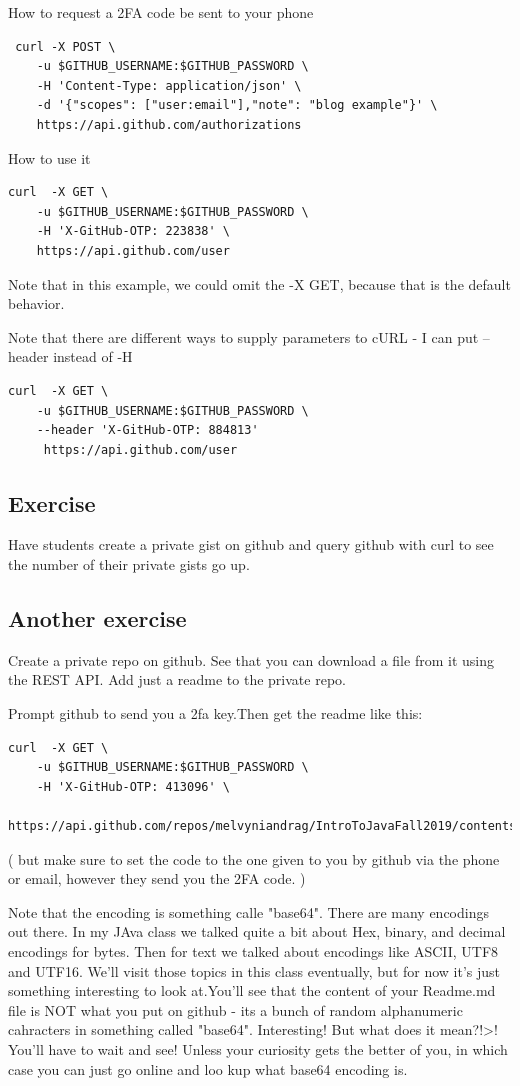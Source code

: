 \documentclass[10pt]{article}
\begin{document}
How to request a 2FA code be sent to your phone
\begin{lstlisting}
 curl -X POST \
	-u $GITHUB_USERNAME:$GITHUB_PASSWORD \
	-H 'Content-Type: application/json' \
	-d '{"scopes": ["user:email"],"note": "blog example"}' \
	https://api.github.com/authorizations
\end{lstlisting}

How to use it
\begin{lstlisting}
curl  -X GET \
	-u $GITHUB_USERNAME:$GITHUB_PASSWORD \
	-H 'X-GitHub-OTP: 223838' \
	https://api.github.com/user
\end{lstlisting}


Note that in this example, we could omit the -X GET, because that is the default behavior.

Note that there are different ways to supply parameters to cURL - I can put --header instead of -H

\begin{lstlisting}
curl  -X GET \
	-u $GITHUB_USERNAME:$GITHUB_PASSWORD \
	--header 'X-GitHub-OTP: 884813'
	 https://api.github.com/user
\end{lstlisting}

\subsection{Exercise}
Have students create a private gist on github and query github with curl to see the number of their private gists go up.

\subsection{Another exercise}
Create a private repo on github. See that you can download a file from it using the REST API. Add just a readme to the private repo.

Prompt github to send you a 2fa key.Then get the readme like this:

\begin{lstlisting}
curl  -X GET \
	-u $GITHUB_USERNAME:$GITHUB_PASSWORD \
	-H 'X-GitHub-OTP: 413096' \
	https://api.github.com/repos/melvyniandrag/IntroToJavaFall2019/contents/Readme.md
\end{lstlisting}

( but make sure to set the code to the one given to you by github via the phone or email, however they send you the 2FA code. )

Note that the encoding is something calle "base64".  There are many encodings out there. In my JAva class we talked quite a bit about Hex, binary, and decimal encodings for bytes. Then for text we talked about encodings like ASCII, UTF8 and UTF16. We'll visit those topics in this class eventually, but for now it's just something interesting to look at.You'll see that the content of your Readme.md file is NOT what you put on github - its a bunch of random alphanumeric cahracters in something called "base64". Interesting! But what does it mean?!>! You'll have to wait and see! Unless your curiosity gets the better of you, in which case you can just go online and loo kup what base64 encoding is.
\end{document}
